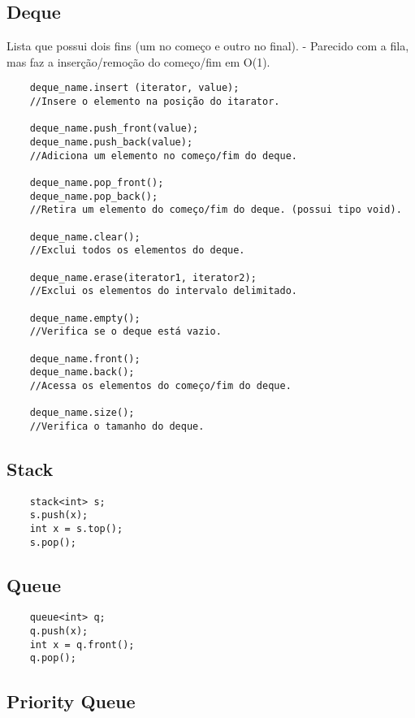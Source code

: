 \subsection{Deque}
    Lista que possui dois fins (um no começo e outro no final).
    - Parecido com a fila, mas faz a inserção/remoção do começo/fim em O(1).
\begin{verbatim}
    deque_name.insert (iterator, value);
    //Insere o elemento na posição do itarator.

    deque_name.push_front(value);
    deque_name.push_back(value);
    //Adiciona um elemento no começo/fim do deque.

    deque_name.pop_front();
    deque_name.pop_back();
    //Retira um elemento do começo/fim do deque. (possui tipo void).

    deque_name.clear();
    //Exclui todos os elementos do deque.

    deque_name.erase(iterator1, iterator2);
    //Exclui os elementos do intervalo delimitado.

    deque_name.empty();
    //Verifica se o deque está vazio.

    deque_name.front();
    deque_name.back();
    //Acessa os elementos do começo/fim do deque.

    deque_name.size();
    //Verifica o tamanho do deque.
\end{verbatim}

\subsection{Stack}

\begin{verbatim}
    stack<int> s;
    s.push(x);
    int x = s.top();
    s.pop();
\end{verbatim}

\subsection{Queue}

\begin{verbatim}
    queue<int> q;
    q.push(x);
    int x = q.front();
    q.pop();
\end{verbatim}

\subsection{Priority Queue}

